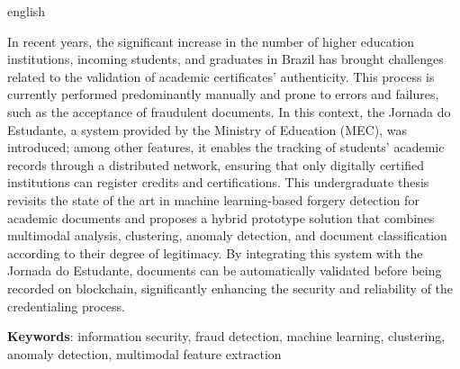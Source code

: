 \begin{resumo}[Abstract]
	\SingleSpacing
	\begin{otherlanguage*}{english}

        In recent years, the significant increase in the number of higher education institutions, incoming students, and graduates in Brazil has brought challenges related to the validation of academic certificates' authenticity. This process is currently performed predominantly manually and prone to errors and failures, such as the acceptance of fraudulent documents. In this context, the Jornada do Estudante, a system provided by the Ministry of Education (MEC), was introduced; among other features, it enables the tracking of students' academic records through a distributed network, ensuring that only digitally certified institutions can register credits and certifications. This undergraduate thesis revisits the state of the art in machine learning-based forgery detection for academic documents and proposes a hybrid prototype solution that combines multimodal analysis, clustering, anomaly detection, and document classification according to their degree of legitimacy. By integrating this system with the Jornada do Estudante, documents can be automatically validated before being recorded on blockchain, significantly enhancing the security and reliability of the credentialing process.
		
		\textbf{Keywords}: information security, fraud detection, machine learning, clustering, anomaly detection, multimodal feature extraction
	\end{otherlanguage*}
\end{resumo}




% 
%
%  

